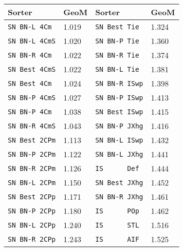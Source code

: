 \begin{tabular}{ l | l || l | l }
Sorter&GeoM&Sorter&GeoM\\ \hline
\verb+SN BN-L 4Cm +&1.019&\verb+SN Best Tie +&1.324\\
\verb+SN BN-L 4CmS+&1.020&\verb+SN BN-P Tie +&1.360\\
\verb+SN BN-R 4Cm +&1.022&\verb+SN BN-R Tie +&1.374\\
\verb+SN Best 4CmS+&1.022&\verb+SN BN-L Tie +&1.381\\
\verb+SN Best 4Cm +&1.024&\verb+SN BN-R ISwp+&1.398\\
\verb+SN BN-P 4CmS+&1.027&\verb+SN BN-P ISwp+&1.413\\
\verb+SN BN-P 4Cm +&1.038&\verb+SN Best ISwp+&1.415\\
\verb+SN BN-R 4CmS+&1.043&\verb+SN BN-P JXhg+&1.416\\
\verb+SN Best 2CPm+&1.113&\verb+SN BN-L ISwp+&1.432\\
\verb+SN BN-P 2CPm+&1.122&\verb+SN BN-L JXhg+&1.441\\
\verb+SN BN-R 2CPm+&1.126&\verb+IS      Def +&1.444\\
\verb+SN BN-L 2CPm+&1.150&\verb+SN Best JXhg+&1.452\\
\verb+SN Best 2CPp+&1.171&\verb+SN BN-R JXhg+&1.461\\
\verb+SN BN-P 2CPp+&1.180&\verb+IS      POp +&1.462\\
\verb+SN BN-L 2CPp+&1.240&\verb+IS      STL +&1.516\\
\verb+SN BN-R 2CPp+&1.243&\verb+IS      AIF +&1.525\\
\end{tabular}
